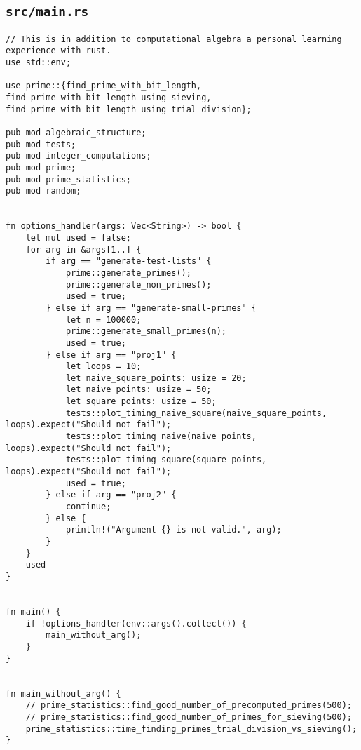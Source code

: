 \subsection{\texttt{src/main.rs}}
\begin{verbatim}
// This is in addition to computational algebra a personal learning experience with rust.
use std::env;

use prime::{find_prime_with_bit_length, find_prime_with_bit_length_using_sieving, find_prime_with_bit_length_using_trial_division};

pub mod algebraic_structure;
pub mod tests;
pub mod integer_computations;
pub mod prime;
pub mod prime_statistics;
pub mod random;


fn options_handler(args: Vec<String>) -> bool {
    let mut used = false;
    for arg in &args[1..] {
        if arg == "generate-test-lists" {
            prime::generate_primes();
            prime::generate_non_primes();
            used = true;
        } else if arg == "generate-small-primes" {
            let n = 100000;
            prime::generate_small_primes(n);
            used = true;
        } else if arg == "proj1" {
            let loops = 10;
            let naive_square_points: usize = 20;
            let naive_points: usize = 50;
            let square_points: usize = 50;
            tests::plot_timing_naive_square(naive_square_points, loops).expect("Should not fail");
            tests::plot_timing_naive(naive_points, loops).expect("Should not fail");
            tests::plot_timing_square(square_points, loops).expect("Should not fail");
            used = true;
        } else if arg == "proj2" {
            continue;
        } else {
            println!("Argument {} is not valid.", arg);
        }
    }
    used
}


fn main() {
    if !options_handler(env::args().collect()) {
        main_without_arg();
    }
}


fn main_without_arg() {
    // prime_statistics::find_good_number_of_precomputed_primes(500);
    // prime_statistics::find_good_number_of_primes_for_sieving(500);
    prime_statistics::time_finding_primes_trial_division_vs_sieving();
}
\end{verbatim}


